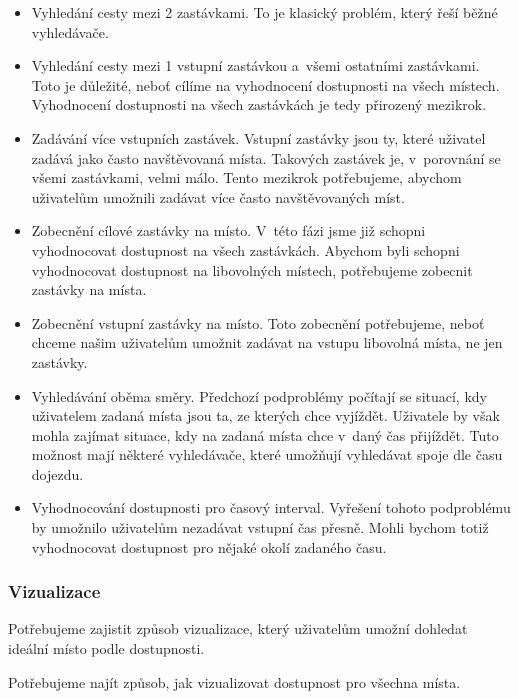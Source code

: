 \begin{itemize}
    \item Vyhledání cesty mezi 2 zastávkami. To je klasický problém, který řeší běžné vyhledávače.
    
    \item Vyhledání cesty mezi 1 vstupní zastávkou a~všemi ostatními zastávkami. Toto je důležité, neboť cílíme na vyhodnocení dostupnosti na všech místech. Vyhodnocení dostupnosti na všech zastávkách je tedy přirozený mezikrok.
    
    \item Zadávání více vstupních zastávek. Vstupní zastávky jsou ty, které uživatel zadává jako často navštěvovaná místa. Takových zastávek je, v~porovnání se všemi zastávkami, velmi málo. Tento mezikrok potřebujeme, abychom uživatelům umožnili zadávat více často navštěvovaných míst.
    
    \item Zobecnění cílové zastávky na místo. V~této fázi jsme již schopni vyhodnocovat dostupnost na všech zastávkách. Abychom byli schopni vyhodnocovat dostupnost na libovolných místech, potřebujeme zobecnit zastávky na místa.
    
    \item Zobecnění vstupní zastávky na místo. Toto zobecnění potřebujeme, neboť chceme našim uživatelům umožnit zadávat na vstupu libovolná místa, ne jen zastávky.
    
    \item Vyhledávání oběma směry. Předchozí podproblémy počítají se situací, kdy uživatelem zadaná místa jsou ta, ze kterých chce vyjíždět. Uživatele by však mohla zajímat situace, kdy na zadaná místa chce v~daný čas přijíždět. Tuto možnost mají některé vyhledávače, které umožňují vyhledávat spoje dle času dojezdu.
    
    \item Vyhodnocování dostupnosti pro časový interval. Vyřešení tohoto podproblému by umožnilo uživatelům nezadávat vstupní čas přesně. Mohli bychom totiž vyhodnocovat dostupnost pro nějaké okolí zadaného času.
\end{itemize}


\subsubsection{Vizualizace}\label{problemyKReseni-vizualizace}

Potřebujeme zajistit způsob vizualizace, který uživatelům umožní dohledat ideální místo podle dostupnosti.

Potřebujeme najít způsob, jak vizualizovat dostupnost pro všechna místa.






